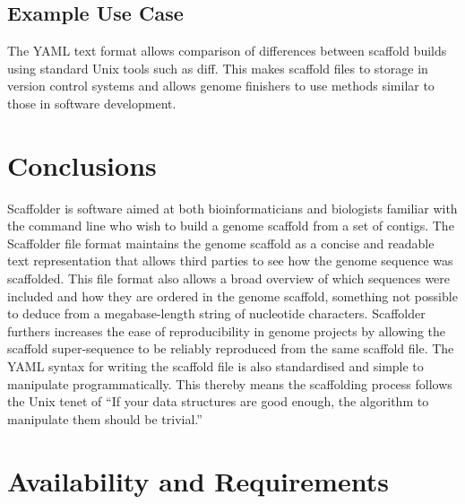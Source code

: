 \documentclass[10pt]{bmc_article}
\newenvironment{bmcformat}{\begin{raggedright}\baselineskip20pt\sloppy\setboolean{publ}{false}}{\end{raggedright}\baselineskip20pt\sloppy}
\begin{document}
\begin{bmcformat}
\subsection*{Example Use Case} %

 \pb

The YAML text format  allows comparison of differences between
scaffold builds using standard Unix tools such as diff. This 
makes scaffold files  to storage in version control systems and
allows genome finishers to use methods similar to those in software
development. \pb 

\clearpage

\section*{Conclusions} %

Scaffolder is software aimed at both bioinformaticians and biologists familiar
with the command line who wish to build a genome scaffold from a set of
contigs. The Scaffolder file format maintains the genome scaffold as a concise
and readable text representation that allows third parties to see how the
genome sequence was scaffolded. This file format also allows a broad overview
of which sequences were included and how they are ordered in the genome
scaffold, something not possible to deduce from a megabase-length string of
nucleotide characters. Scaffolder furthers increases the ease of
reproducibility in genome projects by allowing the scaffold super-sequence to
be reliably reproduced from the same scaffold file. The YAML syntax for
writing the scaffold file is also standardised and simple to manipulate
programmatically. This thereby means the scaffolding process follows the Unix
tenet of ``If your data structures are good enough, the algorithm to
manipulate them should be trivial.''

\clearpage

\section*{Availability and Requirements} %


\end{bmcformat}
\end{document}
